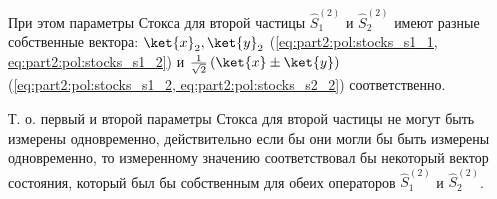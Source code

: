 При этом параметры Стокса для второй частицы  $\hat{S}_1^{(2)}$ и
$\hat{S}_2^{(2)}$ имеют 
разные собственные вектора:
$\ket{x}_2, \ket{y}_2$ (\ref{eq:part2:pol:stocks_s1_1,
  eq:part2:pol:stocks_s1_2}) и
$\frac{1}{\sqrt{2}}\left(\ket{x} \pm
\ket{y}\right)$ (\ref{eq:part2:pol:stocks_s1_2,
  eq:part2:pol:stocks_s2_2}) соответственно.

Т. о. первый и второй параметры Стокса для второй частицы не могут
быть измерены одновременно, действительно если бы они могли бы быть
измерены одновременно, то измеренному значению соответствовал бы
некоторый вектор состояния, который был бы собственным для обеих
операторов $\hat{S}_1^{(2)}$ и
$\hat{S}_2^{(2)}$.
